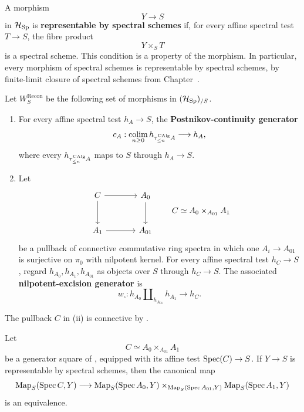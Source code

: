 \begin{definition}
\label{def:representable-by-spectral-schemes}
A morphism
\[
    Y\longrightarrow S
\]
in \(\mathcal H_{\operatorname{Sp}}\) is
\textbf{representable by spectral schemes} if, for every affine spectral test
\(T\to S\), the fibre product
\[
    Y\times_ST
\]
is a spectral scheme. This condition is a property of the morphism. In particular, every morphism of
spectral schemes is representable by spectral schemes, by finite-limit closure
of spectral schemes from Chapter~.
\end{definition}

\begin{definition}
\label{def:global-spectral-reconstruction-generators}
Let \(W^{\mathrm{Recon}}_S\) be the following set of morphisms in
\((\mathcal H_{\operatorname{Sp}})_{/S}\).
\begin{enumerate}[label=(\roman*)]
    \item For every affine spectral test \(h_A\to S\), the
    \textbf{Postnikov-continuity generator}
    \[
        c_A:
        \operatorname*{colim}_{n\geq0}h_{\tau_{\leq n}^{\operatorname{CAlg}}A}
        \longrightarrow
        h_A,
    \]
    where every \(h_{\tau_{\leq n}^{\operatorname{CAlg}}A}\) maps to \(S\) through
    \(h_A\to S\).

    \item Let
    \[
    \begin{tikzcd}[column sep=large, row sep=large]
        C \arrow[r] \arrow[d]
            & A_0 \arrow[d]
        \\
        A_1 \arrow[r]
            & A_{01}
    \end{tikzcd}
    \qquad
    C\simeq A_0\times_{A_{01}}A_1
    \]
    be a pullback of connective commutative ring spectra in which one
    \(A_i\to A_{01}\) is surjective on \(\pi_0\) with nilpotent kernel.
    For every affine spectral test \(h_C\to S\), regard
    \(h_{A_0},h_{A_1},h_{A_{01}}\) as objects over \(S\) through
    \(h_C\to S\). The associated \textbf{nilpotent-excision generator} is
    \[
        w_\square:
        h_{A_0}\amalg_{h_{A_{01}}}h_{A_1}
        \longrightarrow
        h_C.
    \]
\end{enumerate}
The pullback \(C\) in \textup{(ii)} is connective by
.
\end{definition}

\begin{lemma}
\label{lem:represented-nilpotent-excision}
Let
\[
    C\simeq A_0\times_{A_{01}}A_1
\]
be a generator square of
, equipped with its affine
test \(\operatorname{Spec}(C)\to S\). If \(Y\to S\) is representable by spectral
schemes, then the canonical map
\[
    \operatorname{Map}_S(\operatorname{Spec} C,Y)
    \longrightarrow
    \operatorname{Map}_S(\operatorname{Spec} A_0,Y)
    \times_{\operatorname{Map}_S(\operatorname{Spec} A_{01},Y)}
    \operatorname{Map}_S(\operatorname{Spec} A_1,Y)
\]
is an equivalence.
\end{lemma}

